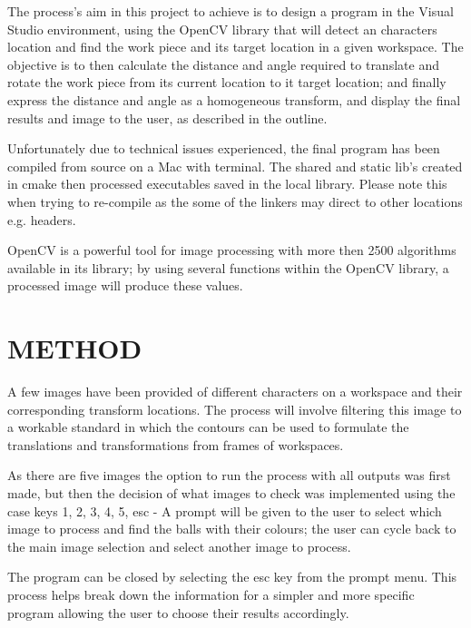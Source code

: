\documentclass[a4paper, 10pt]{article}
\begin{document}
The process's aim in this project to achieve is to design a program in the Visual Studio environment, using the OpenCV library that will detect an characters location and find the work piece and its target location in a given workspace. The objective is to then calculate the distance and angle required to translate and rotate the work piece from its current location to it target location; and finally express the distance and angle as a homogeneous transform, and display the final results and image to the user, as described in the outline. 

Unfortunately due to technical issues experienced, the final program has been compiled from source on a Mac with terminal. The shared and static lib's created in cmake then processed executables saved in the local library. Please note this when trying to re-compile as the some of the linkers may direct to other locations e.g. headers.

OpenCV is a powerful tool for image processing with more then 2500 algorithms available in its library; by using several functions within the OpenCV library, a processed image will produce these values. 


\section{METHOD}

A few images have been provided of different characters on a workspace and their corresponding transform locations. The process will involve filtering this image to a workable standard in which the contours can be used to formulate the translations and transformations from frames of workspaces. 

As there are five images the option to run the process with all outputs was first made, but then the decision of what images to check was implemented using the case keys 1, 2, 3, 4, 5, esc - A prompt will be given to the user to select which image to process and find the balls with their colours; the user can cycle back to the main image selection and select another image to process. 

The program can be closed by selecting the esc key from the prompt menu. This process helps break down the information for a simpler and more specific program allowing the user to choose their results accordingly.
\end{document}

